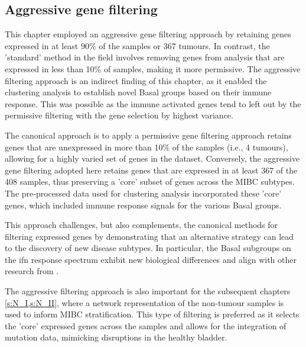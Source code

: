 

\subsection*{Aggressive gene filtering}

This chapter employed an aggressive gene filtering approach by retaining genes expressed in at least 90\% of the samples or 367 tumours. In contrast, the 'standard' method in the field involves removing genes from analysis that are expressed in less than 10\% of samples, making it more permissive. The aggressive filtering approach is an indirect finding of this chapter, as it enabled the clustering analysis to establish novel Basal groups based on their immune response. This was possible as the immune activated genes tend to left out by the permissive filtering with the gene selection by highest variance. 

The canonical approach is to apply a permissive gene filtering approach retains genes that are unexpressed in more than 10\% of the samples (i.e., 4 tumours), allowing for a highly varied set of genes in the dataset. Conversely, the aggressive gene filtering adopted here retains genes that are expressed in at least 367 of the 408 samples, thus preserving a 'core' subset of genes across the MIBC subtypes. The pre-processed data used for clustering analysis incorporated these 'core' genes, which included immune response signals for the various Basal groups.

This approach challenges, but also complements, the canonical methods for filtering expressed genes by demonstrating that an alternative strategy can lead to the discovery of new disease subtypes. In particular, the Basal subgroups on the \acrshort{ifn} response spectrum exhibit new biological differences and align with other research from \citep{Marzouka2018-ge,Baker2022-bj}.

The aggressive filtering approach is also important for the subsequent chapters \cref{s:N_I,s:N_II}, where a network representation of the non-tumour samples is used to inform MIBC stratification. This type of filtering is preferred as it selects the 'core' expressed genes across the samples and allows for the integration of mutation data, mimicking disruptions in the healthy bladder.



